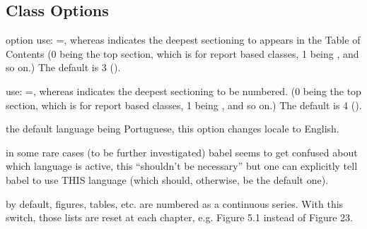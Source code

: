 \documentclass[article,nogeometry,english,tocdepth=3,secdepth=3]{ufrgscca} %
\begin{document}
\subsection{Class Options}
\begin{describelist}{option}
	 { use: =, whereas  indicates the deepest sectioning to appears in the Table of Contents (0 being the top section, which is \tsmacro{\chapter}{} for report based classes, 1 being \tsmacro{\section}{}, and so on.) The default  is 3 (\tsmacro{\subsubsection}{}).}

	 { use: =, whereas  indicates the deepest sectioning to be numbered. (0 being the top section, which is \tsmacro{\chapter}{} for report based classes, 1 being \tsmacro{\section}{}, and so on.) The default is 4 (\tsmacro{\paragraph}{}).}

	 { the default language being Portuguese, this option changes locale to English.}

	 { in some rare cases (to be further investigated) babel seems to get confused about which language is active, this “shouldn't be necessary” but one can explicitly tell babel to use THIS language (which should, otherwise, be the default one).}

	 { by default, figures, tables, etc. are numbered as a continuous series. With this switch, those lists are reset at each chapter, e.g. Figure 5.1 instead of Figure 23.}


\end{describelist}
\end{document}
